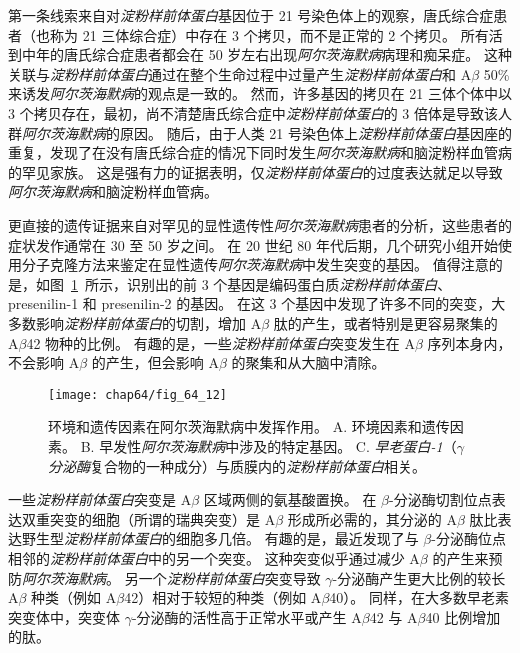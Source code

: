 第一条线索来自对\textit{淀粉样前体蛋白}基因位于 21 号染色体上的观察，唐氏综合症患者（也称为 21 三体综合症）中存在 3 个拷贝，而不是正常的 2 个拷贝。
所有活到中年的唐氏综合症患者都会在 50 岁左右出现\textit{阿尔茨海默病}病理和痴呆症。
这种关联与\textit{淀粉样前体蛋白}通过在整个生命过程中过量产生\textit{淀粉样前体蛋白}和 A$\beta$ 50\% 来诱发\textit{阿尔茨海默病}的观点是一致的。
然而，许多基因的拷贝在 21 三体个体中以 3 个拷贝存在，最初，尚不清楚唐氏综合症中\textit{淀粉样前体蛋白}的 3 倍体是导致该人群\textit{阿尔茨海默病}的原因。
随后，由于人类 21 号染色体上\textit{淀粉样前体蛋白}基因座的重复，发现了在没有唐氏综合症的情况下同时发生\textit{阿尔茨海默病}和脑淀粉样血管病的罕见家族。
这是强有力的证据表明，仅\textit{淀粉样前体蛋白}的过度表达就足以导致\textit{阿尔茨海默病}和脑淀粉样血管病。


更直接的遗传证据来自对罕见的显性遗传性\textit{阿尔茨海默病}患者的分析，这些患者的症状发作通常在 30 至 50 岁之间。
在 20 世纪 80 年代后期，几个研究小组开始使用分子克隆方法来鉴定在显性遗传\textit{阿尔茨海默病}中发生突变的基因。
值得注意的是，如图~\ref{fig:64_12}~所示，识别出的前 3 个基因是编码蛋白质\textit{淀粉样前体蛋白}、presenilin-1 和 presenilin-2 的基因。
在这 3 个基因中发现了许多不同的突变，大多数影响\textit{淀粉样前体蛋白}的切割，增加 A$\beta$ 肽的产生，或者特别是更容易聚集的 A$\beta$42 物种的比例。
有趣的是，一些\textit{淀粉样前体蛋白}突变发生在 A$\beta$ 序列本身内，不会影响 A$\beta$ 的产生，但会影响 A$\beta$ 的聚集和从大脑中清除。


\begin{figure}[htbp]
	\centering
	\texttt{[image: chap64/fig\_64\_12]}
	\caption{环境和遗传因素在阿尔茨海默病中发挥作用。
		A. 环境因素和遗传因素。
		B. 早发性\textit{阿尔茨海默病}中涉及的特定基因。
		C. \textit{早老蛋白-1}（\textit{$\gamma$ 分泌酶}复合物的一种成分）与质膜内的\textit{淀粉样前体蛋白}相关。}
	\label{fig:64_12}
\end{figure}


一些\textit{淀粉样前体蛋白}突变是 A$\beta$ 区域两侧的氨基酸置换。
在 $\beta$-分泌酶切割位点表达双重突变的细胞（所谓的瑞典突变）是 A$\beta$ 形成所必需的，其分泌的 A$\beta$ 肽比表达野生型\textit{淀粉样前体蛋白}的细胞多几倍。
有趣的是，最近发现了与 $\beta$-分泌酶位点相邻的\textit{淀粉样前体蛋白}中的另一个突变。
这种突变似乎通过减少 A$\beta$ 的产生来预防\textit{阿尔茨海默病}。
另一个\textit{淀粉样前体蛋白}突变导致 $\gamma$-分泌酶产生更大比例的较长 A$\beta$ 种类（例如 A$\beta$42）相对于较短的种类（例如 A$\beta$40）。
同样，在大多数早老素突变体中，突变体 $\gamma$-分泌酶的活性高于正常水平或产生 A$\beta$42 与 A$\beta$40 比例增加的肽。


